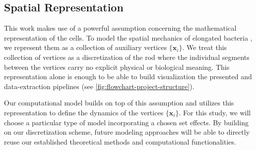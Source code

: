 \documentclass[10pt,letterpaper]{article}
\renewcommand{\vec}[1]{\mathbf{#1}}
\begin{document}
\subsection{Spatial Representation}
\label{subsec:spatial-representation}

This work makes use of a powerful assumption concerning the mathematical representation of the
cells. To model the spatial mechanics of elongated bacteria \cite{Billaudeau2017}, we represent them as a
collection of auxiliary vertices $\{\vec{x}_i\}$.
We treat this collection of vertices as a discretization of the rod where the individual segments
between the vertices carry no explicit physical or biological meaning.
This representation alone is enough to be able to build visualization the presented
and data-extraction pipelines (see \ref{fig:flowchart-project-structure}).

Our computational model builds on top of this assumption and utilizes this representation to
define the dynamics of the vertices $\{\vec{x}_i\}$.
For this study, we will choose a particular type of model incorporating a chosen set effects.
By building on our discretization scheme, future modeling approaches will be able to directly reuse
our established theoretical methods and computational functionalities.
\end{document}
